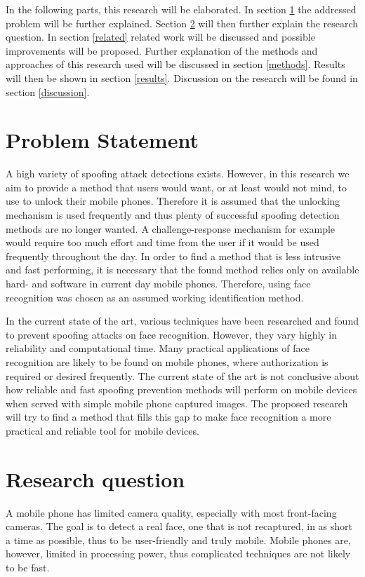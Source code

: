 \documentclass{sig-alternate-br}
\begin{document}
In the following parts, this research will be elaborated. In section \ref{problem} the addressed problem will be further explained. Section \ref{question} will then further explain the research question. In section \ref{related} related work will be discussed and possible improvements will be proposed. Further explanation of the methods and approaches of this research used will be discussed in section \ref{methods}. Results will then be shown in section \ref{results}. Discussion on the research will be found in section \ref{discussion}.

\section{Problem Statement} \label{problem}
A high variety of spoofing attack detections exists. However, in this research we aim to provide a method that users would want, or at least would not mind, to use to unlock their mobile phones. Therefore it is assumed that the unlocking mechanism is used frequently and thus plenty of successful spoofing detection methods are no longer wanted. A challenge-response mechanism for example would require too much effort and time from the user if it would be used frequently throughout the day. In order to find a method that is less intrusive and fast performing, it is necessary that the found method relies only on available hard- and software in current day mobile phones. Therefore, using face recognition was chosen as an assumed working identification method.

In the current state of the art, various techniques have been researched and found to prevent spoofing attacks on face recognition. However, they vary highly in reliability and computational time. Many practical applications of face recognition are likely to be found on mobile phones, where authorization is required or desired frequently. The current state of the art is not conclusive about how reliable and fast spoofing prevention methods will perform on mobile devices when served with simple mobile phone captured images. The proposed research will try to find a method that fills this gap to make face recognition a more practical and reliable tool for mobile devices.

\section{Research question} \label{question}
A mobile phone has limited camera quality, especially with most front-facing cameras. The goal is to detect a real face, one that is not recaptured, in as short a time as possible, thus to be user-friendly and truly mobile. Mobile phones are, however, limited in processing power, thus complicated techniques are not likely to be fast.
\end{document}
